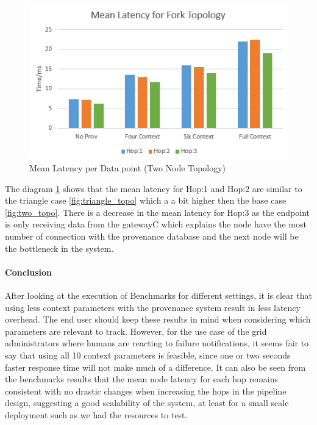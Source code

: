 \begin{figure}[H]
	\center
	\includegraphics[width=\textwidth]{figures/ForkTopology_latency.PNG}
	\caption{Mean Latency per Data point  (Two Node Topology)}
	\label{fig:forktopo_latency}
\end{figure}

The diagram \ref{fig:forktopo_latency} shows that the mean latency for Hop:1 and Hop:2 are similar to the triangle case \ref{fig:triangle_topo} which a a bit higher then the base case \ref{fig:two_topo}. There is a decrease in the mean latency for Hop:3 as the endpoint is only receiving data from the gatewayC which explains the node have the most number of connection with the provenance database and the next node will be the bottleneck in the system. 

\paragraph*{Conclusion}
After looking at the execution of Benchmarks for different settings, it is clear that using less context parameters with the provenance system result in less latency overhead. 
The end user should keep these results in mind when considering which parameters are relevant to track.
However, for the use case of the grid administrators where humans are reacting to failure notifications, it seems fair to say that using all 10 context parameters is feasible, since one or two seconds faster response time will not make much of a difference.
It can also be seen from the benchmarks results that the mean node latency for each hop remains consistent with no drastic changes when increasing the hops in the pipeline design, suggesting a good scalability of the system, at least for a small scale deployment such as we had the resources to test.

